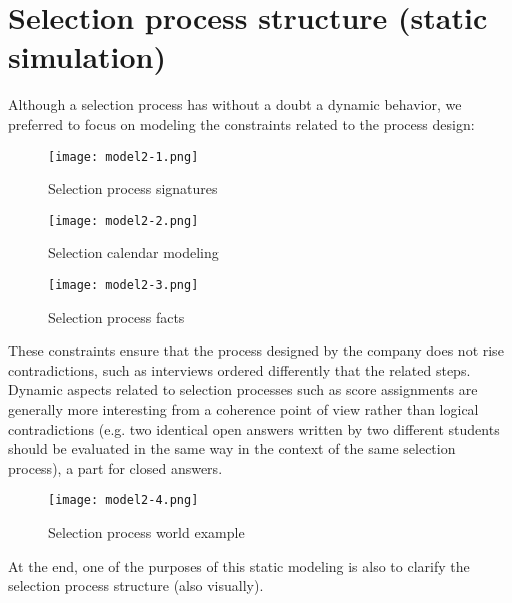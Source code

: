 	\section{Selection process structure (static simulation)}
		Although a selection process has without a doubt a dynamic behavior, we preferred to focus on modeling the constraints related to the process design:
		\begin{figure}
			\texttt{[image: model2-1.png]}
			\caption{Selection process signatures}
		\end{figure}
		\begin{figure}
			\texttt{[image: model2-2.png]}
			\caption{Selection calendar modeling}
		\end{figure}
		\begin{figure}[H]
			\centering
			\texttt{[image: model2-3.png]}
			\caption{Selection process facts}
		\end{figure}
		These constraints ensure that the process designed by the company does not rise contradictions, such as interviews ordered differently that the related steps.
		Dynamic aspects related to selection processes such as score assignments are generally more interesting from a coherence point of view rather than logical contradictions (e.g. two identical open answers written by two different students should be evaluated in the same way in the context of the same selection process), a part for closed answers.
		\begin{figure}[H]
			\centering
			\texttt{[image: model2-4.png]}
			\caption{Selection process world example}
		\end{figure}
		At the end, one of the purposes of this static modeling is also to clarify the selection process structure (also visually).